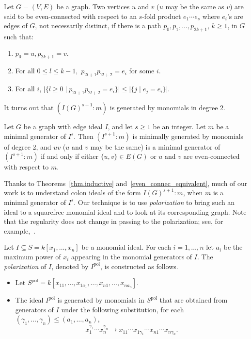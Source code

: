 \documentclass[ALCO,ThmDefs,Unicode,epreuves]{cedram}
\DeclareMathOperator{\pol}{pol}
\begin{document}
\begin{defi}\label{even_connected} Let $G=(V,E)$ be a graph. Two vertices $u$ and $v$ ($u$ may be the same as $v$) are
said to be even-connected with respect to an $s$-fold product $e_1\cdots e_s$ where $e_i$'s are edges of $G$, not necessarily distinct,
if there is a path $p_0,p_1,\ldots, p_{2k+1}$, $k\geq 1$, in $G$ such that:
\begin{enumerate}
 \item\label{def2.15_1} $p_0=u,p_{2k+1}=v.$
 \item\label{def2.15_2} For all $0 \leq l \leq k-1,$ $p_{2l+1}p_{2l+2}=e_i$ for some $i$.
 \item\label{def2.15_3} For all $i$, $\big|\{l \geq 0 \mid p_{2l+1}p_{2l+2}=e_i \}\big| \le \big|\{j \mid e_j=e_i\}\big|$.
\end{enumerate}
\end{defi}

It turns out that $(I(G)^{s+1} : m)$ is generated by monomials in degree 2.

\begin{theo} \label{even_connec_equivalent}
Let $G$ be a graph with edge ideal
$I$, and let $s \geq 1$ be an integer. Let $m$ be a minimal generator of $I^s$.
Then $(I^{s+1} : m)$ is minimally generated by monomials of degree 2, and $uv$ ($u$ and $v$ may
be the same) is a minimal generator of $(I^{s+1} : m )$ if and only if either $\{u, v\} \in E(G) $ or $u$ and $v$ are even-connected with respect to $m$.
 \end{theo}

Thanks to Theorems~\ref{thm.inductive} and~\ref{even_connec_equivalent}, much of our work is to understand colon ideals of the form $I(G)^{s+1}:m$, when $m$ is a minimal generator of $I^s$. Our technique is to use \emph{polarization} to bring such an ideal to a squarefree monomial ideal and to look at its corresponding graph. Note that the regularity does not change in passing to the polarization; see, for example,~\cite[Corollary 1.6.3]{HH}.

\begin{defi}\label{def.polarization}
Let $I \subseteq S = k[x_1, \ldots, x_n]$ be a monomial ideal.
For each $i = 1, \ldots, n$ let $a_i$ be the maximum power of $x_i$ appearing in the monomial generators of $I$. The \emph{polarization} of $I$, denoted by $I^{\pol}$, is constructed as follows.
\begin{itemize}
\item Let $S^{\pol} = k[x_{11}, \ldots, x_{1a_1}, \ldots, x_{n1}, \ldots, x_{na_n}]$.
\item The ideal $I^{\pol}$ is generated by monomials in $S^{\pol}$ that are obtained from generators of $I$ under the following substitution, for each $(\gamma_1, \ldots, \gamma_n) \le (a_1, \dots, a_n)$,
\[
x_1^{\gamma_1} \cdots x_n^{\gamma_n} \longrightarrow x_{11} \cdots x_{1\gamma_1} \cdots x_{n1} \cdots x_{n\gamma_n}.
\]

\end{itemize}
\end{defi}
\end{document}

